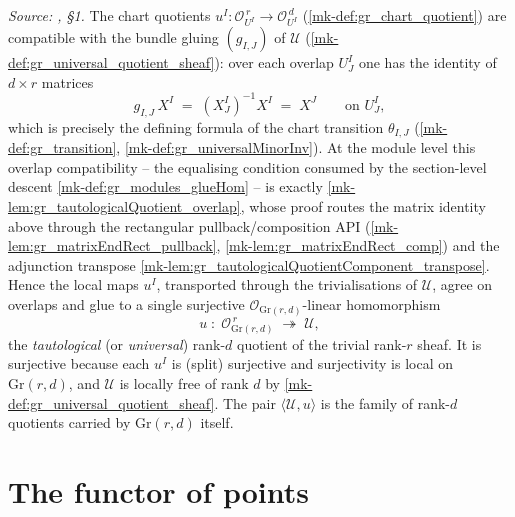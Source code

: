 \begin{definition}\label{mk-def:tautological_quotient}
  \leanok

  \textit{Source: \cite{nitsure-hilbert-quot}, \S 1.}
  The chart quotients \(u^I : \mathcal{O}_{U^I}^{\,r} \to \mathcal{O}_{U^I}^{\,d}\)
  (\ref{mk-def:gr_chart_quotient}) are compatible with the bundle gluing
  \((g_{I,J})\) of \(\mathcal{U}\) (\ref{mk-def:gr_universal_quotient_sheaf}): over
  each overlap \(U^I_J\) one has the identity of \(d \times r\) matrices
  \[
    g_{I,J}\, X^I \;=\; (X^I_J)^{-1} X^I \;=\; X^J \qquad \text{on } U^I_J,
  \]
  which is precisely the defining formula of the chart transition
  \(\theta_{I,J}\) (\ref{mk-def:gr_transition}, \ref{mk-def:gr_universalMinorInv}). At the
  module level this overlap compatibility -- the equalising condition consumed by the
  section-level descent \ref{mk-def:gr_modules_glueHom} -- is exactly
  \ref{mk-lem:gr_tautologicalQuotient_overlap}, whose proof routes the matrix identity above
  through the rectangular pullback/composition API
  (\ref{mk-lem:gr_matrixEndRect_pullback}, \ref{mk-lem:gr_matrixEndRect_comp}) and the
  adjunction transpose \ref{mk-lem:gr_tautologicalQuotientComponent_transpose}.
  Hence the local maps \(u^I\), transported through the trivialisations of
  \(\mathcal{U}\), agree on overlaps and glue to a single surjective
  \(\mathcal{O}_{\mathrm{Gr}(r,d)}\)-linear homomorphism
  \[
    u \;:\; \mathcal{O}_{\mathrm{Gr}(r,d)}^{\,r}
      \;\twoheadrightarrow\; \mathcal{U},
  \]
  the \emph{tautological} (or \emph{universal}) rank-\(d\) quotient of the trivial
  rank-\(r\) sheaf. It is surjective because each \(u^I\) is (split) surjective and
  surjectivity is local on \(\mathrm{Gr}(r,d)\), and \(\mathcal{U}\) is locally
  free of rank \(d\) by \ref{mk-def:gr_universal_quotient_sheaf}. The pair
  \(\langle \mathcal{U}, u \rangle\) is the family of rank-\(d\) quotients carried
  by \(\mathrm{Gr}(r,d)\) itself.
\end{definition}

\section{The functor of points}
\label{mk-sec:grquot_functor}

